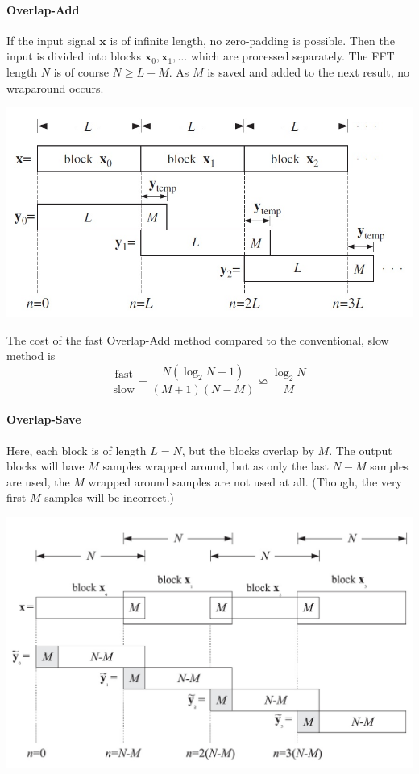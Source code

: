 \paragraph{Overlap-Add}
If the input signal $\mathbf{x}$ is of infinite length, no zero-padding
is possible. Then the input is divided into blocks 
$\mathbf{x}_0, \mathbf{x}_1, \ldots$ which are processed separately. 
The FFT length $N$ is of course $N \geq L+M$. As $M$ is saved and added
to the next result, no wraparound occurs.

\begin{center}
	\includegraphics[width=0.9\linewidth]{images/DFT_FFT_overlapAdd.jpg}
\end{center}

The cost of the fast Overlap-Add method compared to the conventional, slow
method is
\begin{equation*}
	\frac{\text{fast}}{\text{slow}} = \frac{N (\log_2 N + 1)}{(M+1)(N-M)} \backsimeq \frac{\log_2 N}{M}
\end{equation*}

\paragraph{Overlap-Save}
Here, each block is of length $L=N$, but the blocks overlap by $M$. The output
blocks will have $M$ samples wrapped around, but as only the last $N-M$
samples are used, the $M$ wrapped around samples are not used at all.
(Though, the very first $M$ samples will be incorrect.)
\begin{center}
	\includegraphics[width=0.9\linewidth]{images/DFT_FFT_overlapSave.jpg}
\end{center}